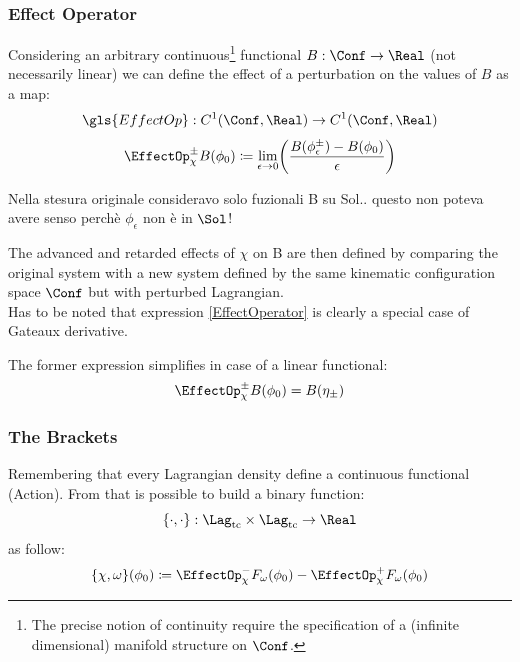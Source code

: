 \documentclass[Main]{subfiles}
\begin{document}
		\subsubsection{Effect Operator}
		Considering an arbitrary continuous\footnote{The precise notion of continuity require the specification of a (infinite dimensional) manifold structure on $\Conf$.} functional $B: \Conf \rightarrow \Real$ (not necessarily linear) we can define the effect of a perturbation on the values of $B$\cite[pag. 5]{Marolf1993} as a map:
		\begin{displaymath}
			\gls{EffectOp} : C^1(\Conf,\Real) \rightarrow C^1(\Conf,\Real)
		\end{displaymath}
		\begin{equation}\label{EffectOperator}
		\EffectOp_\chi^\pm B ( \phi_0) 
		\coloneqq \lim_{\epsilon \rightarrow 0}
		 \biggr( \frac{B(\phi_\epsilon^\pm) - B (\phi_0)}{\epsilon} \biggr)
		\end{equation}
\ifToninus
	\begin{Warning}
		Nella stesura originale consideravo solo fuzionali B su Sol..  questo non poteva avere senso perchè $\phi_\epsilon$ non è in $\Sol$!
	\end{Warning}
\fi
		The advanced and retarded effects of $\chi$ on B are then defined by comparing the original system with a new system defined by the same kinematic configuration space $\Conf$ but with perturbed Lagrangian.
		\\
			Has to be noted that expression \ref{EffectOperator} is clearly a special case of Gateaux derivative.\cite{Blanchard2015}
		
		
		The former expression simplifies in case of a linear functional:
			\begin{equation}\label{EffectOperatorLinear}
				\EffectOp_\chi^\pm B ( \phi_0) =  B(\eta_\pm)
			\end{equation}
		
		\subsubsection{The Brackets}
		Remembering that every Lagrangian density define a continuous functional (Action).
		From that is possible to build a binary function:
		\begin{displaymath}
			\{\cdot,\cdot\}:\Lag_{\textrm{tc}} \times \Lag_{\textrm{tc}} \rightarrow \Real 	
		\end{displaymath}
		as follow:
		\begin{equation}\label{AbstractPeierlsBracket}
				\{\chi, \omega \}(\phi_0) \coloneqq \EffectOp_\chi^- F_\omega (\phi_0) - \EffectOp_\chi^+ F_\omega(\phi_0)
		\end{equation}
\end{document}
